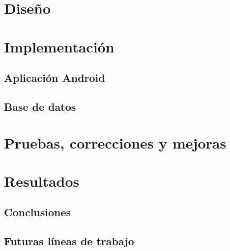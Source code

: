 \cleardoublepage



\chapter{Diseño}

\cleardoublepage



\chapter{Implementación}

    \section{Aplicación Android}


    \section{Base de datos}


\cleardoublepage



\chapter{Pruebas, correcciones y mejoras}

\cleardoublepage



\chapter{Resultados}

    \section{Conclusiones}


    \section{Futuras líneas de trabajo}


\cleardoublepage
